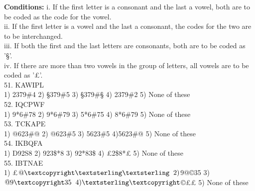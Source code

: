 \documentclass[
]{article}
\begin{document}
\textbf{Conditions:}
i. If the first letter is a consonant and the last a vowel, both are to be coded as the code for the
vowel.\\
ii. If the first letter is a vowel and the last a consonant, the codes for the two are to be
interchanged.\\
iii. If both the first and the last letters are consonants, both are to be coded as '§'.\\
iv. If there are more than two vowels in the group of letters, all vowels are to be coded as '£'.\\

51. KAWIPL\\
1) 2379\#4 \hspace{2mm}2) §379\#5 \hspace{2mm}3) §379\#§ \hspace{2mm}4) 2379\#2 \hspace{2mm}5) None of these\\

52. IQCPWF\\
1) 9*6\#78 \hspace{2mm}2) 9*6\#79 \hspace{2mm}3) 5*6\#75 \hspace{2mm}4) 8*6\#79 \hspace{2mm}5) None of these\\

53. TCKAPE\\
1) @623\#@ \hspace{2mm}2) @623\#5 \hspace{2mm}3) 5623\#5 \hspace{2mm}4)5623\#@ \hspace{2mm}5) None of these\\

54. IKBQFA\\
1) D92S8 \hspace{2mm}2) 923\$*8 \hspace{2mm}3) 92*83\$ \hspace{2mm}4) £2\$8*£ \hspace{2mm}5) None of these\\

55. IBTNAE\\
1) £$@©££ \hspace{2mm}2) $9@©35 \hspace{2mm}3) $@9©35 \hspace{2mm}4) £©$©££ \hspace{2mm}5) None of these\\
\end{document}
